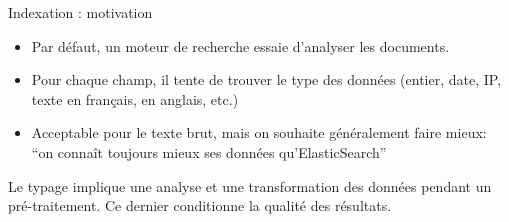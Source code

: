 \begin{frame}{Indexation : motivation}
  \begin{itemize}
    \item Par défaut, un moteur de recherche essaie d'analyser les documents.
    \item Pour chaque champ, il tente de trouver le type des données  (entier, date, IP, texte en français, en anglais, etc.)
\item Acceptable pour le texte brut, mais on souhaite généralement faire mieux: ``on 
connaît toujours mieux ses données qu'ElasticSearch'' 
  \end{itemize}

\vfill

\begin{blocgauche}
Le typage implique  une \alert{analyse} et une \alert{transformation} des données
pendant un \alert{pré-traitement}. Ce dernier
  conditionne la qualité des résultats.
\end{blocgauche}

\end{frame}

